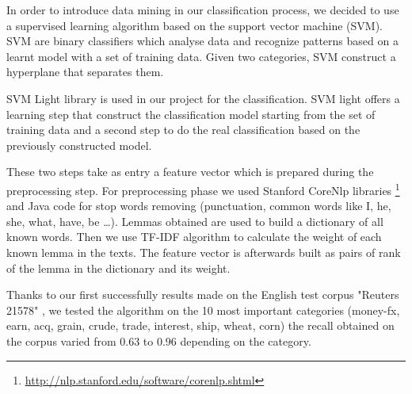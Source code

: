\documentclass{llncs}
\begin{document}
In order to introduce data mining in our classification process, we decided to use a supervised learning algorithm based on the support vector machine (SVM). SVM are binary classifiers which analyse data and recognize patterns based on a learnt model with a set of training data. Given two categories, SVM construct a hyperplane that separates them.

SVM Light library \cite{joachim:svmlight} is used in our project for the classification. SVM light offers a learning step that construct the classification model starting from the set of training data and a second step to do the real classification based on the previously constructed model.

These two steps take as entry a feature vector which is prepared during the preprocessing step. For preprocessing phase we used Stanford CoreNlp libraries \footnote{\url{http://nlp.stanford.edu/software/corenlp.shtml}} and  Java code for stop words removing (punctuation, common words like I, he, she, what, have, be …).
Lemmas obtained are used to build a dictionary of all known words. Then we use TF-IDF algorithm to calculate the weight of each known lemma in the texts. The feature vector is afterwards built as pairs of rank of the lemma in the dictionary and its weight.

Thanks to our first successfully results made on the English test corpus "Reuters 21578" \cite{lewis:reuters}, we tested the algorithm on the 10 most important categories (money-fx, earn, acq, grain, crude, trade, interest, ship, wheat, corn) the recall obtained on the corpus varied from 0.63 to 0.96 depending on the category.
\end{document}
